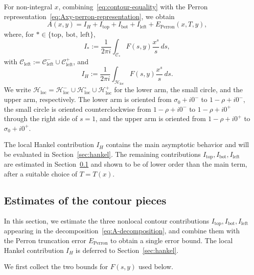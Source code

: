 For non-integral $x$, combining~\eqref{eq:contour-equality} with
the Perron representation~\eqref{eq:Axy-perron-representation},
we obtain
\begin{equation}\label{eq:A-decomposition}
    A(x, y) = I_H + I_{\mathrm{top}} + I_{\mathrm{bot}}
            + I_{\mathrm{left}} + E_{\mathrm{Perron}}(x, T, y),
\end{equation}
where, for $* \in \{\mathrm{top},\ \mathrm{bot},\ \mathrm{left}\}$,
\begin{equation}\label{eq:I-pieces}
    I_* := \frac{1}{2\pi i} \int_{\mathcal{C}_*}
    F(s, y) \frac{x^s}{s}\, ds,
\end{equation}
with $\mathcal{C}_{\mathrm{left}} := \mathcal{C}_{\mathrm{left}}^-
\cup \mathcal{C}_{\mathrm{left}}^+$, and
\begin{equation}\label{eq:I-H}
    I_H := \frac{1}{2\pi i} \int_{\mathcal{H}_{\mathrm{loc}}}
    F(s, y) \frac{x^s}{s}\, ds.
\end{equation}
We write $\mathcal{H}_{\mathrm{loc}}
=\mathcal{H}_{\mathrm{loc}}^-\cup\mathcal{H}_{\mathrm{loc}}^\circ
\cup\mathcal{H}_{\mathrm{loc}}^+$ for the lower arm, the small
circle, and the upper arm, respectively.
The lower arm is oriented from $\sigma_0+i0^-$ to $1-\rho+i0^-$,
the small circle is oriented counterclockwise from $1-\rho+i0^-$
to $1-\rho+i0^+$ through the right side of $s=1$, and the upper
arm is oriented from $1-\rho+i0^+$ to $\sigma_0+i0^+$.

The local Hankel contribution $I_H$ contains the main asymptotic
behavior and will be evaluated in Section~\ref{sec:hankel}. The
remaining contributions $I_{\mathrm{top}}, I_{\mathrm{bot}},
I_{\mathrm{left}}$ are estimated in
Section~\ref{sec:contour-estimates} and shown to be of lower
order than the main term, after a suitable choice of $T = T(x)$.

\subsection{Estimates of the contour pieces}\label{sec:contour-estimates}

In this section, we estimate the three nonlocal contour
contributions $I_{\mathrm{top}}, I_{\mathrm{bot}},
I_{\mathrm{left}}$ appearing in the
decomposition~\eqref{eq:A-decomposition}, and combine them with
the Perron truncation error $E_{\mathrm{Perron}}$ to obtain a
single error bound. The local Hankel contribution $I_H$ is
deferred to Section~\ref{sec:hankel}.

We first collect the two bounds for $F(s,y)$ used below.

